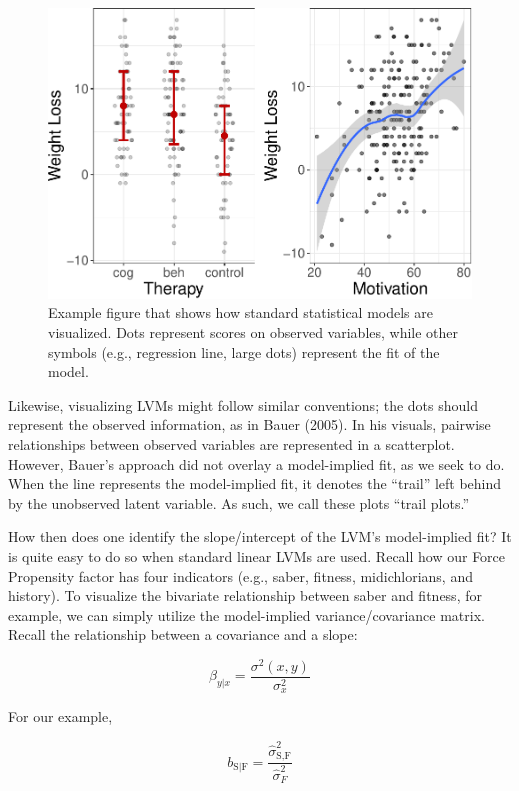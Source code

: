 \documentclass[
  english,
  doc]{apa6}
\begin{document}
\begin{figure}
\centering
\includegraphics{flexplavaan_draft_files/figure-latex/scatter-1.pdf}
\caption{\label{fig:scatter}Example figure that shows how standard statistical models are visualized. Dots represent scores on observed variables, while other symbols (e.g., regression line, large dots) represent the fit of the model.}
\end{figure}

Likewise, visualizing LVMs might follow similar conventions; the dots should represent the observed information, as in Bauer (2005). In his visuals, pairwise relationships between observed variables are represented in a scatterplot. However, Bauer's approach did not overlay a model-implied fit, as we seek to do. When the line represents the model-implied fit, it denotes the ``trail'' left behind by the unobserved latent variable. As such, we call these plots ``trail plots.''

How then does one identify the slope/intercept of the LVM's model-implied fit? It is quite easy to do so when standard linear LVMs are used. Recall how our Force Propensity factor has four indicators (e.g., saber, fitness, midichlorians, and history). To visualize the bivariate relationship between saber and fitness, for example, we can simply utilize the model-implied variance/covariance matrix. Recall the relationship between a covariance and a slope:

\[\beta_{y|x} = \frac{\sigma^2(x,y)}{\sigma^2_x}\]

For our example,

\[b_{\text{S}|\text{F}} = \frac{\hat{\sigma}^2_{\text{S},\text{F}}}{\hat{\sigma}^2_F}\]
\end{document}
